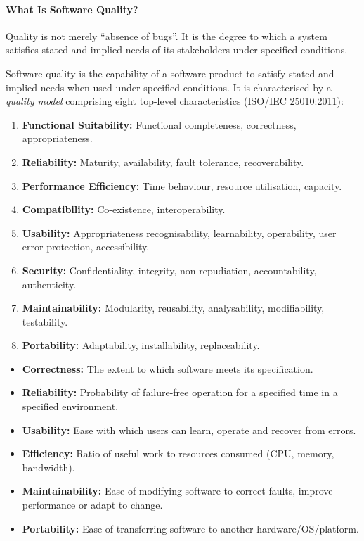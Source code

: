 \documentclass[11pt]{article}
\newcommand{\cle}[1]{{\popxbold\color{popdark}#1}}
\newcounter{popsec}
\newcounter{popsub}
\newcommand{\courssub}[1]{%
  \stepcounter{popsub}%
  \par\vspace{9pt}\noindent{\popxbold\fontsize{11.5}{13}\selectfont\color{popink}{\color{poporange}\thepopsec.\thepopsub}\hspace{6pt}#1}\par\nopagebreak\vspace{4pt}
}
\begin{document}
\courssub{Software Quality}

\paragraph{What Is Software Quality?}
Quality is not merely ``absence of bugs''. It is the degree to which a system satisfies stated and implied needs of its stakeholders under specified conditions.

\begin{definition}
\cle{Software quality} is the capability of a software product to satisfy stated and implied needs when used under specified conditions. It is characterised by a \emph{quality model} comprising eight top-level characteristics (ISO/IEC 25010:2011):
\begin{enumerate}
\item \textbf{Functional Suitability:} Functional completeness, correctness, appropriateness.
\item \textbf{Reliability:} Maturity, availability, fault tolerance, recoverability.
\item \textbf{Performance Efficiency:} Time behaviour, resource utilisation, capacity.
\item \textbf{Compatibility:} Co-existence, interoperability.
\item \textbf{Usability:} Appropriateness recognisability, learnability, operability, user error protection, accessibility.
\item \textbf{Security:} Confidentiality, integrity, non-repudiation, accountability, authenticity.
\item \textbf{Maintainability:} Modularity, reusability, analysability, modifiability, testability.
\item \textbf{Portability:} Adaptability, installability, replaceability.
\end{enumerate}
\end{definition}

\begin{aretenir}
\begin{itemize}
\item \textbf{Correctness:} The extent to which software meets its specification.
\item \textbf{Reliability:} Probability of failure-free operation for a specified time in a specified environment.
\item \textbf{Usability:} Ease with which users can learn, operate and recover from errors.
\item \textbf{Efficiency:} Ratio of useful work to resources consumed (CPU, memory, bandwidth).
\item \textbf{Maintainability:} Ease of modifying software to correct faults, improve performance or adapt to change.
\item \textbf{Portability:} Ease of transferring software to another hardware/OS/platform.
\end{itemize}
\end{aretenir}
\end{document}
